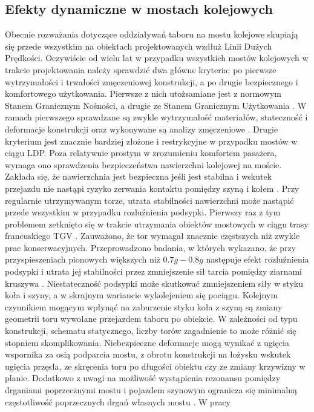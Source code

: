 

\subsection{Efekty dynamiczne w mostach kolejowych} \label{sect:railway_dynamic_effects}
Obecnie rozważania dotyczące oddziaływań taboru na mostu kolejowe skupiają się przede wszystkim na obiektach projektowanych wzdłuż Linii Dużych Prędkości. Oczywiście od wielu lat w przypadku wszystkich mostów kolejowych w trakcie projektowania należy sprawdzić dwa główne kryteria: po pierwsze wytrzymałości i trwałości zmęczeniowej konstrukcji, a po drugie bezpiecznego i komfortowego użytkowania. Pierwsze z nich utożsamiane jest z normowym Stanem Granicznym Nośności, a drugie ze Stanem Granicznym Użytkowania \parencite{PolskiKomitetNormalizacyjny2004}. W ramach pierwszego sprawdzane są zwykle wytrzymałość materiałów, stateczność i deformacje konstrukcji oraz wykonywane są analizy zmęczeniowe \parencite{Ladislav2008}. Drugie kryterium jest znacznie bardziej złożone i restrykcyjne w przypadku mostów w ciągu LDP. Poza relatywnie prostym w zrozumieniu komfortem pasażera, wymaga ono sprawdzenia bezpieczeństwa nawierzchni kolejowej na moście. Zakłada się, że nawierzchnia jest bezpieczna jeśli jest stabilna i wskutek przejazdu nie nastąpi ryzyko zerwania kontaktu pomiędzy szyną i kołem \parencite{Ramondenc2008}. Przy regularnie utrzymywanym torze, utrata stabilności nawierzchni może nastąpić przede wszystkim w przypadku rozluźnienia podsypki. Pierwszy raz z tym problemem zetknięto się w trakcie utrzymania obiektów mostowych w ciągu trasy francuskiego TGV \parencite{Ramondenc1998}. Zauważono, że tor wymagał znacznie częstszych niż zwykle prac konserwacyjnych. Przeprowadzono badania, w których wykazano, że przy przyspieszeniach pionowych większych niż $0.7g-0.8g$ następuje efekt rozluźnienia podsypki i utrata jej stabilności przez zmniejszenie sił tarcia pomiędzy ziarnami kruszywa \parencite{Zacher2008}. Niestateczność podsypki może skutkować zmniejszeniem siły w styku koła i szyny, a w skrajnym wariancie wykolejeniem się pociągu. Kolejnym czynnikiem mogącym wpłynąć na zaburzenie styku koła z szyną są zmiany geometrii toru wywołane przejazdem taboru po obiekcie. W zależności od typu konstrukcji, schematu statycznego, liczby torów zagadnienie to może różnić się stopniem skomplikowania. Niebezpieczne deformacje mogą wynikać z ugięcia wspornika za osią podparcia mostu, z obrotu konstrukcji na łożysku wskutek ugięcia przęsła, ze skręcenia toru po długości obiektu czy ze zmiany krzywizny w planie. Dodatkowo z uwagi na możliwość wystąpienia rezonansu pomiędzy drganiami poprzecznymi mostu i pojazdem szynowym ogranicza się minimalną częstotliwość poprzecznych drgań własnych mostu \parencite{Goicolea2003,Dias2007,Dias2008}. W pracy 
